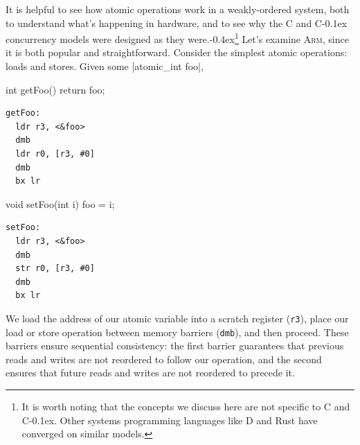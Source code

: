 \documentclass[fontsize=10pt, oneside]{scrartcl}
\newcommand{\punckern}{\kern-0.4ex}
\newcommand{\monobox}[1]{\mbox{\texttt{#1}}}
\newcommand{\keyword}[1]{\monobox{\color{darkGreen}#1}}
\newcommand{\cplusplus}[1]{C\kern-0.1ex\raisebox{0.15ex}{\texttt{++}}#1}
\newcommand{\clang}[1]{C#1}
\begin{document}
It is helpful to see how atomic operations work in a weakly-ordered system,
both to understand what's happening in hardware,
and to see why the \clang{} and \cplusplus{} concurrency models were designed as they were.\punckern\footnote{%
It is worth noting that the concepts we discuss here are not specific to \clang{} and \cplusplus{}.
Other systems programming languages like D and Rust have converged on similar models.}
Let's examine \textsc{Arm}, since it is both popular and straightforward.
Consider the simplest atomic operations: loads and stores.
Given some \cc|atomic_int foo|,
\newline
\begin{minipage}{0.35\linewidth}
\begin{ccode}
int getFoo()
{
    return foo;
}
\end{ccode}
\end{minipage}\hfill
{}\hfill
\begin{minipage}{0.43\linewidth}
\begin{lstlisting}[language={[ARM]Assembler}]
getFoo:
  ldr r3, <&foo>
  dmb
  ldr r0, [r3, #0]
  dmb
  bx lr
\end{lstlisting}
\end{minipage}
\begin{minipage}{0.35\linewidth}
\begin{ccode}
void setFoo(int i)
{
    foo = i;
}
\end{ccode}
\end{minipage}\hfill
{}\hfill
\begin{minipage}{0.43\linewidth}
\begin{lstlisting}[language={[ARM]Assembler}]
setFoo:
  ldr r3, <&foo>
  dmb
  str r0, [r3, #0]
  dmb
  bx lr
\end{lstlisting}
\end{minipage}
We load the address of our atomic variable into a scratch register (\texttt{r3}),
place our load or store operation between memory barriers (\keyword{dmb}), and then proceed.
These barriers ensure sequential consistency:
the first barrier guarantees that previous reads and writes are not reordered to follow our operation,
and the second ensures that future reads and writes are not reordered to precede it.
\end{document}
